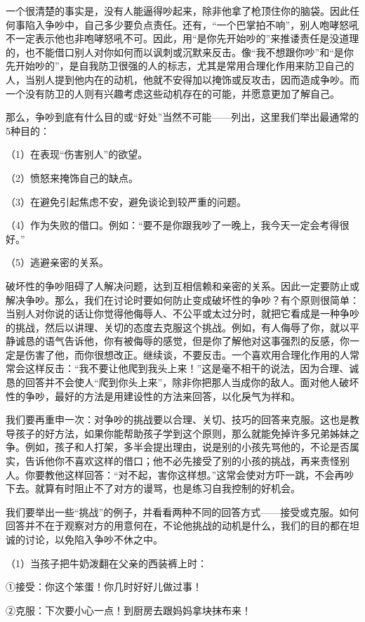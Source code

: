 \documentclass[12pt,UTF8,openany]{ctexbook}
\begin{document}
一个很清楚的事实是，没有人能逼得吵起来，除非他拿了枪顶住你的脑袋。因此任何事陷入争吵中，自己多少要负点责任。还有，“一个巴掌拍不响”，别人咆哮怒吼不一定表示他也非咆哮怒吼不可。因此，用“是你先开始吵的”来推诿责任是没道理的，也不能借口别人对你如何而以讽刺或沉默来反击。像“我不想跟你吵”和“是你先开始吵的”，是自我防卫很强的人的标志，尤其是常用合理化作用来防卫自己的人，当别人提到他内在的动机，他就不安得加以掩饰或反攻击，因而造成争吵。而一个没有防卫的人则有兴趣考虑这些动机存在的可能，并愿意更加了解自己。

那么，争吵到底有什么目的或“好处”当然不可能——列出，这里我们举出最通常的5种目的：

（1）在表现“伤害别人”的欲望。

（2）愤怒来掩饰自己的缺点。

（3）在避免引起焦虑不安，避免谈论到较严重的问题。

（4）作为失败的借口。例如：“要不是你跟我吵了一晚上，我今天一定会考得很好。”

（5）逃避亲密的关系。

破坏性的争吵阻碍了人解决问题，达到互相信赖和亲密的关系。因此一定要防止或解决争吵。那么，我们在讨论时要如何防止变成破坏性的争吵？有个原则很简单：当别人对你说的话让你觉得他侮辱人、不公平或太过分时，就把它看成是一种争吵的挑战，然后以讲理、关切的态度去克服这个挑战。例如，有人侮辱了你，就以平静诚恳的语气告诉他，你有被侮辱的感觉，但是你了解他对这事强烈的反感，你一定是伤害了他，而你很想改正。继续谈，不要反击。一个喜欢用合理化作用的人常常会这样反击：“我不要让他爬到我头上来！”这是毫不相干的说法，因为合理、诚恳的回答并不会使人“爬到你头上来”，除非你把那人当成你的敌人。面对他人破坏性的争吵，最好的方法是用建设性的方法来回答，以化戾气为祥和。

我们要再重申一次：对争吵的挑战要以合理、关切、技巧的回答来克服。这也是教导孩子的好方法，如果你能帮助孩子学到这个原则，那么就能免掉许多兄弟姊妹之争。例如，孩子和人打架，多半会提出理由，说是别的小孩先骂他的，不论是否属实，告诉他你不喜欢这样的借口；他不必先接受了别的小孩的挑战，再来责怪别人。你要教他这样回答：“对不起，害你这样想。”这常会使对方吓一跳，不会再吵下去。就算有时阻止不了对方的谩骂，也是练习自我控制的好机会。

我们要举出一些“挑战”的例子，并看看两种不同的回答方式——接受或克服。如何回答并不在于观察对方的用意何在，不论他挑战的动机是什么，我们的目的都在坦诚的讨论，以免陷入争吵不休之中。

（1）当孩子把牛奶泼翻在父亲的西装裤上时：

①接受：你这个笨蛋！你几时好好儿做过事！

②克服：下次要小心一点！到厨房去跟妈妈拿块抹布来！
\end{document}
